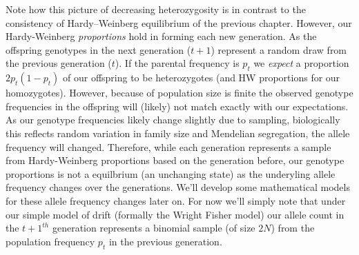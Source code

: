 Note how this picture of decreasing heterozygosity is in contrast to the
consistency of Hardy--Weinberg equilibrium of the previous chapter. 
However, our Hardy-Weinberg \emph{proportions} hold in forming each new
generation. As the offspring genotypes in the next generation ($t+1$) represent a random
draw from the previous generation ($t$). If the parental frequency is $p_t$ we
\emph{expect} a proportion $2p_t(1-p_t)$ of our offspring to be
heterozygotes (and HW proportions for our homozygotes). However, because of population size is finite the
observed genotype frequencies in the offspring will (likely) not match exactly with our
expectations. As our genotype frequencies likely change slightly due
to sampling, biologically this reflects random variation in family size
and Mendelian segregation, the allele frequency will changed. 
Therefore, while each generation represents a sample from
Hardy-Weinberg proportions based on the generation before, our
genotype proportions is not a equilbrium (an unchanging state) as the
underyling allele frequency changes over the generations. We'll develop some mathematical models for these allele
frequency changes later on. For now we'll simply note that
under our simple model of drift (formally the Wright Fisher model) our
allele count in the $t+1^{th}$ generation represents a binomial sample
(of size $2N$) from the population frequency $p_t$ in the previous
generation.  




